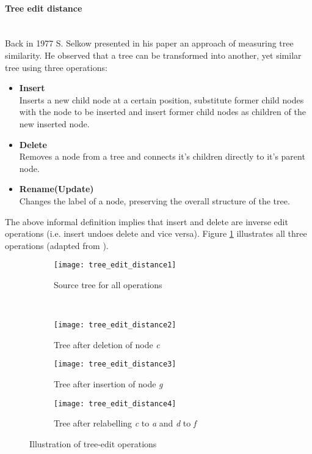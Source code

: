 \documentclass[12pt, notitlepage]{article}
\begin{document}
\paragraph{Tree edit distance} ~\\
Back in 1977 S. Selkow presented in his paper\cite{tree-editing-distance} an approach of measuring tree similarity. He observed that a tree can be transformed into another, yet similar tree 
using three operations:
\begin{itemize}
	\item \textbf{Insert}\\
	Inserts a new child node at a certain position, substitute former child nodes with the node to be inserted and insert former child nodes as children of the new inserted node.  
	\item \textbf{Delete}\\
	Removes a node from a tree and connects it's children directly to it's parent node.
	\item \textbf{Rename(Update)}\\
	Changes the label of a node, preserving the overall structure of the tree.
\end{itemize}
The above informal definition implies that insert and delete are inverse edit operations (i.e. insert undoes delete and vice versa). Figure \ref{fig:tree_operations} illustrates all three operations (adapted from \cite{tree-edit-distance-survey}). 
\begin{figure}[H]
        \centering
        \begin{subfigure}[h!]{0.3\textwidth}
                \texttt{[image: tree\_edit\_distance1]}
                \caption{Source tree for all operations}
        \end{subfigure}
\\
        \begin{subfigure}[h!]{0.3\textwidth}
                \texttt{[image: tree\_edit\_distance2]}
                \caption{Tree after deletion of node \textit{c}}
        \end{subfigure}
\quad
        \begin{subfigure}[h!]{0.3\textwidth}
                \texttt{[image: tree\_edit\_distance3]}
                \caption{Tree after insertion of node \textit{g}}
        \end{subfigure}
\quad
        \begin{subfigure}[h!]{0.3\textwidth}
                \texttt{[image: tree\_edit\_distance4]}
                \caption{Tree after relabelling \textit{c} to \textit{a} and \textit{d} to \textit{f}}
        \end{subfigure}
        \caption{Illustration of tree-edit operations}\label{fig:tree_operations}
\end{figure}
\end{document}
